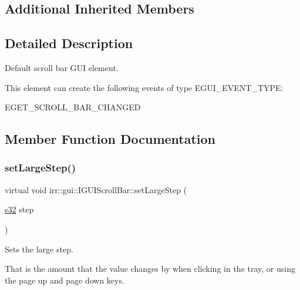 \subsection*{Additional Inherited Members}


\subsection{Detailed Description}
Default scroll bar G\+UI element. 

\begin{DoxyParagraph}{This element can create the following events of type E\+G\+U\+I\+\_\+\+E\+V\+E\+N\+T\+\_\+\+T\+Y\+PE\+:}
\begin{DoxyItemize}
\item E\+G\+E\+T\+\_\+\+S\+C\+R\+O\+L\+L\+\_\+\+B\+A\+R\+\_\+\+C\+H\+A\+N\+G\+ED \end{DoxyItemize}

\end{DoxyParagraph}


\subsection{Member Function Documentation}
\mbox{\label{classirr_1_1gui_1_1IGUIScrollBar_a2872ee4bc49bb26c979b4c891c567ab2}} 
\subsubsection{\texorpdfstring{set\+Large\+Step()}{setLargeStep()}\hspace{0.1cm}{\footnotesize\ttfamily [1/2]}}
{\footnotesize\ttfamily virtual void irr\+::gui\+::\+I\+G\+U\+I\+Scroll\+Bar\+::set\+Large\+Step (\begin{DoxyParamCaption}\item[{\hyperlink{namespaceirr_ac66849b7a6ed16e30ebede579f9b47c6}{s32}}]{step }\end{DoxyParamCaption})\hspace{0.3cm}{\ttfamily [pure virtual]}}



Sets the large step. 

That is the amount that the value changes by when clicking in the tray, or using the page up and page down keys. \mbox{\label{classirr_1_1gui_1_1IGUIScrollBar_a2872ee4bc49bb26c979b4c891c567ab2}} 
